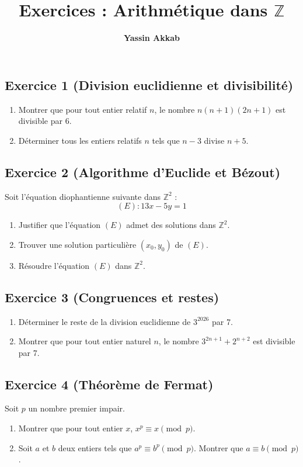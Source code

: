 \documentclass{article}
\title{\textbf{Exercices : Arithmétique dans $\mathbb{Z}$}}
\author{\textbf{Yassin Akkab}}
\begin{document}
	
	\maketitle
	
	\subsection*{Exercice 1 (Division euclidienne et divisibilité)}
	\begin{enumerate}
		\item Montrer que pour tout entier relatif $n$, le nombre $n(n+1)(2n+1)$ est divisible par 6.
		\item Déterminer tous les entiers relatifs $n$ tels que $n-3$ divise $n+5$.
	\end{enumerate}
	
	\subsection*{Exercice 2 (Algorithme d'Euclide et Bézout)}
	Soit l'équation diophantienne suivante dans $\mathbb{Z}^2$ :
	\[ (E) : 13x - 5y = 1 \]
	\begin{enumerate}
		\item Justifier que l'équation $(E)$ admet des solutions dans $\mathbb{Z}^2$.
		\item Trouver une solution particulière $(x_0, y_0)$ de $(E)$.
		\item Résoudre l'équation $(E)$ dans $\mathbb{Z}^2$.
	\end{enumerate}
	
	\subsection*{Exercice 3 (Congruences et restes)}
	\begin{enumerate}
		\item Déterminer le reste de la division euclidienne de $3^{2026}$ par 7.
		\item Montrer que pour tout entier naturel $n$, le nombre $3^{2n+1} + 2^{n+2}$ est divisible par 7.
	\end{enumerate}
	
	\subsection*{Exercice 4 (Théorème de Fermat)}
	Soit $p$ un nombre premier impair.
	\begin{enumerate}
		\item Montrer que pour tout entier $x$, $x^p \equiv x \pmod p$.
		\item Soit $a$ et $b$ deux entiers tels que $a^p \equiv b^p \pmod p$. Montrer que $a \equiv b \pmod p$.
	\end{enumerate}
	
\end{document}
